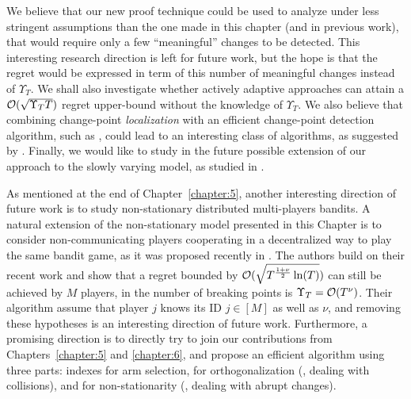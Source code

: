 We believe that our new proof technique could be used to analyze \GLRklUCB{} under less stringent assumptions than the one made in this chapter (and in previous work), that would require only a few ``meaningful'' changes to be detected. This interesting research direction is left for future work,  but the hope is that the regret would be expressed in term of this number of meaningful changes instead of $\Upsilon_T$. We shall also investigate whether actively adaptive approaches can attain a $\mathcal{O}(\sqrt{\Upsilon_T T})$ regret upper-bound without the knowledge of $\Upsilon_T$.
We also believe that combining change-point \emph{localization} with an efficient change-point detection algorithm, such as \GLRklUCB, could lead to an interesting class of algorithms, as suggested by \cite{Maillard2018GLR}.
Finally, we would like to study in the future possible extension of our approach to the slowly varying model, as studied in \cite{Besbes14stochastic,WeiSrivastava18Abruptly}.

As mentioned at the end of Chapter~\ref{chapter:5}, another interesting direction of future work is to study non-stationary distributed multi-players bandits.
A natural extension of the non-stationary model presented in this Chapter is to consider non-communicating players cooperating in a decentralized way to play the same bandit game, as it was proposed recently in \cite{WeiSrivastava18Distributed}.
The authors build on their recent work \cite{WeiSrivastava18Abruptly} and show that a regret bounded by $\mathcal{O}(\sqrt{T^{\frac{1+\nu}{2}} \ln(T)})$ can still be achieved by $M$ players, in the number of breaking points is $\Upsilon_T = \mathcal{O}(T^{\nu})$.
Their algorithm assume that player $j$ knows its ID $j\in[M]$ as well as $\nu$, and removing these hypotheses is an interesting direction of future work.
Furthermore, a promising direction is to directly try to join our contributions from Chapters~\ref{chapter:5} and \ref{chapter:6}, and propose an efficient algorithm using three parts:
\klUCB{} indexes for arm selection,
\MCTopM{} for orthogonalization (\ie, dealing with collisions),
and \GLRklUCB{} for non-stationarity (\ie, dealing with abrupt changes).
%


